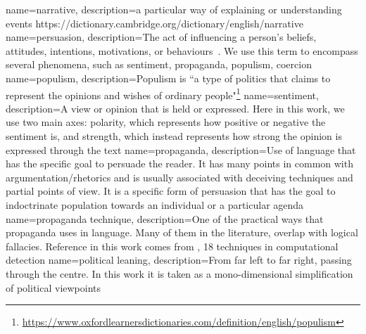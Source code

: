 {
        name=narrative,
        description={a particular way of explaining or understanding events 
            https://dictionary.cambridge.org/dictionary/english/narrative
        }
}
{
        name=persuasion,
        description={The act of influencing a person's beliefs, attitudes, intentions, motivations, or behaviours~\cite{gass2018persuasion}. We use this term to encompass several phenomena, such as sentiment, \gls{propaganda}, \gls{populism}, coercion}
}
{
        name=populism,
        description={Populism is ``a type of politics that claims to represent the opinions and wishes of ordinary people"\footnote{\url{https://www.oxfordlearnersdictionaries.com/definition/english/populism}}}
}
{
        name=sentiment,
        description={A view or opinion that is held or expressed. Here in this work, we use two main axes: polarity, which represents how positive or negative the sentiment is, and strength, which instead represents how strong the opinion is expressed through the text}
}
{
        name=propaganda,
        description={Use of language that has the specific goal to persuade the reader. It has many points in common with argumentation/rhetorics and is usually associated with deceiving techniques and partial points of view.
        It is a specific form of persuasion
        that has the goal to indoctrinate
        population towards an individual or a particular agenda}
}
{
        name=propaganda technique,
        description={One of the practical ways that propaganda uses in language. Many of them in the literature, overlap with logical fallacies. Reference in this work comes from \cite{TODO}, 18 techniques in computational detection}
}
{
        name=political leaning,
        description={From far left to far right, passing through the centre. In this work it is taken as a mono-dimensional simplification of political viewpoints}
}
